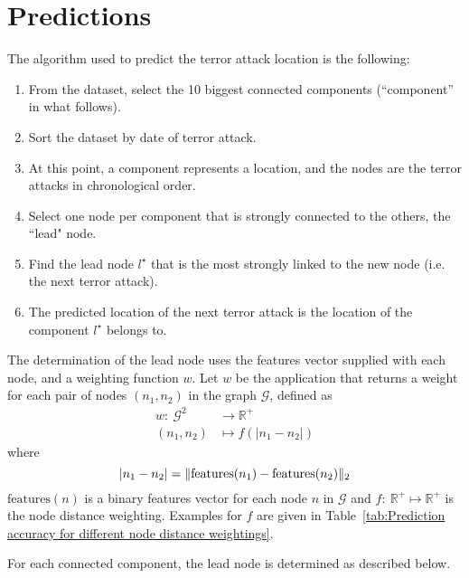 \section{Predictions}
\label{sec:Predictions}

The algorithm used to predict the terror attack location is the following:
\begin{enumerate}
\item From the dataset, select the 10 biggest connected components (``component'' in what follows).
\item Sort the dataset by date of terror attack.
\item At this point, a component represents a location, and the nodes are the terror attacks in chronological order.
\item Select one node per component that is strongly connected to the others, the ``lead" node.
\item Find the lead node $l^\star$ that is the most strongly linked to the new node (i.e. the next terror attack).
\item The predicted location of the next terror attack is the location of the component $l^\star$ belongs to.
\end{enumerate}

The determination of the lead node uses the features vector supplied with each node, and a weighting function $w$.
Let $w$ be the application that returns a weight for each pair of nodes $(n_1,n_2)$ in the graph $\mathcal{G}$, defined as
\begin{align}
w:~ \mathcal{G}^2	& \to \mathbb{R}^+ \\
(n_1,n_2) 			& \mapsto f(|n_1-n_2|)
\end{align}
where
\begin{equation}
|n_1-n_2| = \| \text{features}(n_1)-\text{features}(n_2)\|_2 \\
\end{equation}
$\text{features}(n)$ is a binary features vector for each node $n\text{ in }\mathcal{G}$ and $f:~\mathbb{R}^+ \mapsto  \mathbb{R}^+$ is the node distance weighting.
Examples for $f$ are given in Table~\ref{tab:Prediction accuracy for different node distance weightings}.

For each connected component, the lead node is determined as described below.

